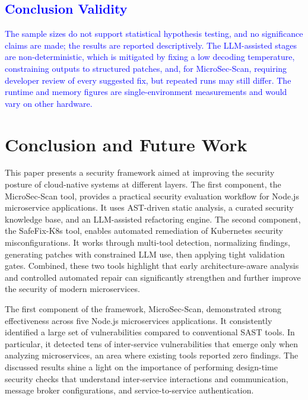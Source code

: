 \documentclass[preprint,12pt]{elsarticle}
\newcommand{\new}[1]{\textcolor{blue}{#1}}
\begin{document}
\new{\subsection{Conclusion Validity}}

\new{The sample sizes do not support statistical hypothesis testing, and no
significance claims are made; the results are reported descriptively. The
LLM-assisted stages are non-deterministic, which is mitigated by fixing a low
decoding temperature, constraining outputs to structured patches, and, for
MicroSec-Scan, requiring developer review of every suggested fix, but repeated
runs may still differ. The runtime and memory figures are single-environment
measurements and would vary on other hardware.}



\section{Conclusion and Future Work}

This paper presents a security framework aimed at improving the security posture of cloud-native systems at different layers. The first component, the MicroSec-Scan tool, provides a practical security evaluation workflow for Node.js microservice applications. It uses AST-driven static analysis, a curated security knowledge base, and an LLM-assisted refactoring engine. The second component, the SafeFix-K8s tool, enables automated remediation of Kubernetes security misconfigurations. It works through multi-tool detection, normalizing findings, generating patches with constrained LLM use, then applying tight validation gates. Combined, these two tools highlight that early architecture-aware analysis and controlled automated repair can significantly strengthen and further improve the security of modern microservices.

The first component of the framework, MicroSec-Scan, demonstrated strong effectiveness across five Node.js microservices applications. It consistently identified a large set of vulnerabilities compared to conventional SAST tools. In particular, it detected tens of inter-service vulnerabilities that emerge only when analyzing microservices, an area where existing tools reported zero findings. The discussed results shine a light on the importance of performing design-time security checks that understand inter-service interactions and communication, message broker configurations, and service-to-service authentication.
\end{document}
